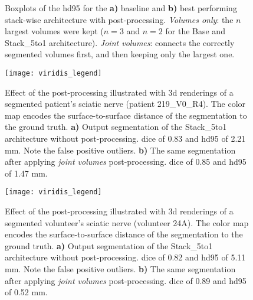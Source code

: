 \begin{figure}[htbp]
	\centering
	\hfill
	\caption[Boxplots of the \acrlong{hd95} for the post-processing]{Boxplots of the \acrlong{hd95} for the \textbf{a)} baseline and \textbf{b)} best performing stack-wise architecture with post-processing.  \textit{Volumes only}: the $n$ largest volumes were kept ($n = 3$ and $n = 2$ for the Base and Stack\_5to1 architecture). \textit{Joint volumes}: connects the correctly segmented volumes first, and then keeping only the largest one.}
	\label{fig:pp_boxplots_hd95}  
\end{figure}

\begin{figure}[htbp]
	\centering
	\subfloat[]
	{
		\label{fig:subfig:219_V0_R4_np}            \texttt{[image: 219\_V0\_R4\_np]}
	}
	\hfill
	\subfloat[]
	{
		\label{fig:subfig:219_V0_R4_pp}            \texttt{[image: 219\_V0\_R4\_pp]}
	}
	\hfill
	\texttt{[image: viridis\_legend]}
	
	\caption[3-D Renderings of Patient Nerve]{Effect of the post-processing illustrated with \gls{3d} renderings of a segmented patient's sciatic nerve (patient 219\_V0\_R4). The color map encodes the surface-to-surface distance of the segmentation to the ground truth. \textbf{a)} Output segmentation of the Stack\_5to1 architecture without post-processing. \acrlong{dice} of 0.83 and \acrlong{hd95} of 2.21 mm. Note the false positive outliers. \textbf{b)} The same segmentation after applying \textit{joint volumes} post-processing.  \acrlong{dice} of 0.85 and \acrlong{hd95} of 1.47 mm.}
	\label{fig:pp_render_219_V0_R4}   
\end{figure}

\begin{figure}[htbp]
	\centering
	\subfloat[]
	{
		\label{fig:subfig:24A_np}            \texttt{[image: 24A\_np]}
	}
	\hfill
	\subfloat[]
	{
		\label{fig:subfig:24A_pp}            \texttt{[image: 24A\_pp]}
	}
	\hfill
	\texttt{[image: viridis\_legend]}
	
	\caption[3-D Renderings of Volunteer Nerve]{Effect of the post-processing illustrated with \gls{3d} renderings of a segmented volunteer's sciatic nerve (volunteer 24A). The color map encodes the surface-to-surface distance of the segmentation to the ground truth. \textbf{a)} Output segmentation of the Stack\_5to1 architecture without post-processing. \acrlong{dice} of 0.82 and \acrlong{hd95} of 5.11 mm. Note the false positive outliers. \textbf{b)} The same segmentation after applying \textit{joint volumes} post-processing.  \acrlong{dice} of 0.89 and \acrlong{hd95} of 0.52 mm.}
	\label{fig:pp_render_24A}   
\end{figure}

